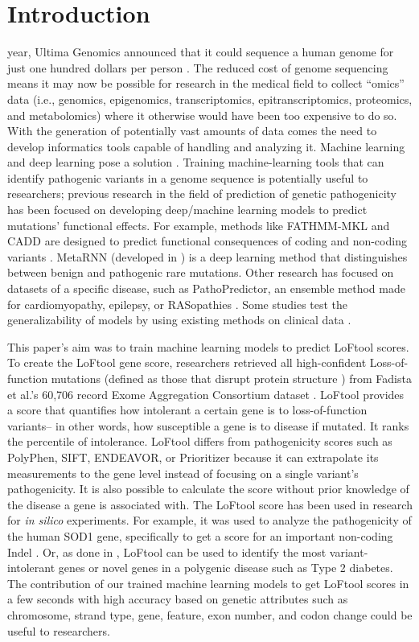 \documentclass[journal,two side,web]{ieeecolor}
\begin{document}
\section{Introduction}
\label{sec:introduction}
 year, Ultima Genomics announced that it could sequence a human genome for just one hundred dollars per person \cite{genome100}. The reduced cost of genome sequencing means it may now be possible for research in the medical field to collect “omics” data (i.e., genomics, epigenomics, transcriptomics, epitranscriptomics, proteomics, and metabolomics) where it otherwise would have been too expensive to do so. With the generation of potentially vast amounts of data comes the need to develop  informatics tools capable of handling and analyzing it. Machine learning and deep learning pose a solution \cite{caudai2021ai}. Training machine-learning tools that can identify pathogenic variants in a genome sequence is potentially useful to researchers; previous research in the field of prediction of genetic pathogenicity has been focused on developing deep/machine learning models to predict mutations’ functional effects. For example, methods like FATHMM-MKL and CADD are designed to predict functional consequences of coding and non-coding variants \cite{shihab2015integrative}. MetaRNN (developed in \cite{li2022metarnn}) is a deep learning method that distinguishes between benign and pathogenic rare mutations. Other research has focused on datasets of a specific disease, such as PathoPredictor, an ensemble method made for cardiomyopathy, epilepsy, or RASopathies \cite{evans2019genetic}. Some studies test the generalizability of models by using existing methods on clinical data \cite{gunning2021assessing}.

This paper’s aim was to train machine learning models to predict LoFtool scores. To create the LoFtool gene score, researchers retrieved all high-confident Loss-of-function mutations (defined as those that disrupt protein structure \cite{gerasimavicius2022loss}) from Fadista et al.’s 60,706 record Exome Aggregation Consortium dataset \cite{fadista2017loftool}. LoFtool provides a score that quantifies how intolerant a certain gene is to loss-of-function variants– in other words, how susceptible a gene is to disease if mutated. It ranks the percentile of intolerance. LoFtool differs from pathogenicity scores such as PolyPhen, SIFT, ENDEAVOR, or Prioritizer because it can extrapolate its measurements to the gene level instead of focusing on a single variant’s pathogenicity. It is also possible to calculate the score without prior knowledge of the disease a gene is associated with. The LoFtool score has been used in research for \emph{in silico} experiments. For example, it was used to analyze the pathogenicity of the human SOD1 gene, specifically to get a score for an important non-coding Indel \cite{tripathi2020genetic}. Or, as done in \cite{taneera2019gnas}, LoFtool can be used to identify the most variant-intolerant genes or novel genes in a polygenic disease such as Type 2 diabetes. The contribution of our trained machine learning models to get LoFtool scores in a few seconds with high accuracy based on genetic attributes such as chromosome, strand type, gene, feature, exon number, and codon change could be useful to researchers.
\end{document}
